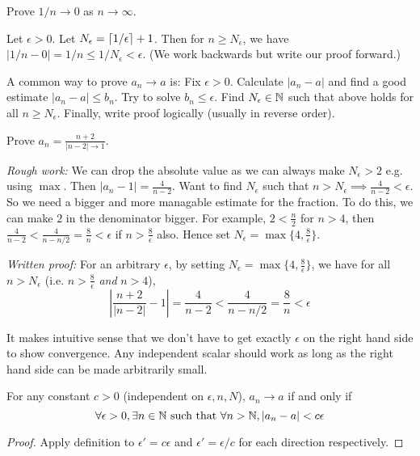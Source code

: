 \documentclass[11pt]{article}
\begin{document}
\begin{exercise}
  Prove \(1/n \to 0\) as \(n\to\infty\).
\end{exercise}
\begin{solution}
  Let \(\epsilon >0\). Let \(N_\epsilon=\left \lceil 1/\epsilon \right \rceil+1\). Then for \(n\geq N_\epsilon\), we have \(|1/n-0|=1/n\leq 1/N_\epsilon < \epsilon\). (We work backwards but write our proof forward.)
\end{solution}

A common way to prove \(a_n\to a\) is: Fix \(\epsilon>0\). Calculate \(|a_n-a|\) and find a good estimate \(|a_n-a|\leq b_n\). Try to solve \(b_n\leq\epsilon\). Find \(N_\epsilon\in\mathbb{N}\) such that above holds for all \(n\geq N_\epsilon\). Finally, write proof logically (usually in reverse order).

\begin{example}
  Prove \(a_n=\frac{n+2}{|n-2|\to 1}\).

  \emph{Rough work:} 
  We can drop the absolute value as we can always make \(N_\epsilon>2\) e.g. using \(\max\). Then \(|a_n-1|=\frac{4}{n-2}\). Want to find \(N_\epsilon\) such that \(n>N_\epsilon\implies\frac{4}{n-2}<\epsilon\). So we need a bigger and more managable estimate for the fraction. To do this, we can make \(2\) in the denominator bigger. For example, \(2<\frac{n}{2}\) for \(n>4\), then \(\frac{4}{n-2}<\frac{4}{n-n/2}=\frac{8}{n}<\epsilon\) if \(n>\frac{8}{\epsilon}\) also. Hence set \(N_\epsilon=\max\{4,\frac{8}{\epsilon}\}\).

  \vspace{5pt}\emph{Written proof:}
  For an arbitrary \(\epsilon\), by setting \(N_\epsilon=\max\{4,\frac{8}{\epsilon}\}\), we have for all \(n>N_\epsilon\) (i.e. \(n>\frac{8}{\epsilon}\) \emph{and} \(n>4\)),
  \[\left|\frac{n+2}{|n-2|}-1\right|=\frac{4}{n-2}<\frac{4}{n-n/2}=\frac{8}{n}<\epsilon\]
\end{example}

It makes intuitive sense that we don't have to get exactly \(\epsilon\) on the right hand side to show convergence. Any independent scalar should work as long as the right hand side can be made arbitrarily small.
\begin{proposition}
  For any constant \(c>0\) (independent on \(\epsilon,n,N\)), \(a_n\to a\) if and only if 
  \[\forall \epsilon >0, \exists n\in\mathbb{N} \text{ such that } \forall n>\mathbb{N}, |a_n-a|<c\epsilon\]
\end{proposition}
\begin{proof}
  Apply definition to \(\epsilon'=c\epsilon\) and \(\epsilon'=\epsilon/c\) for each direction respectively.
\end{proof}
\end{document}
